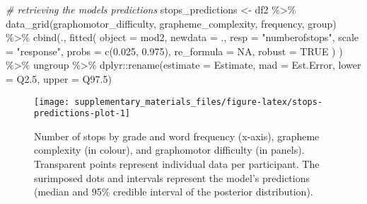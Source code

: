 \documentclass[
  11pt,
  english,
  ,doc,floatsintext]{apa6}
\newenvironment{Shaded}{}{}
\newcommand{\AttributeTok}[1]{\textcolor[rgb]{0.49,0.56,0.16}{#1}}
\newcommand{\CommentTok}[1]{\textcolor[rgb]{0.38,0.63,0.69}{\textit{#1}}}
\newcommand{\ConstantTok}[1]{\textcolor[rgb]{0.53,0.00,0.00}{#1}}
\newcommand{\FloatTok}[1]{\textcolor[rgb]{0.25,0.63,0.44}{#1}}
\newcommand{\FunctionTok}[1]{\textcolor[rgb]{0.02,0.16,0.49}{#1}}
\newcommand{\NormalTok}[1]{#1}
\newcommand{\OtherTok}[1]{\textcolor[rgb]{0.00,0.44,0.13}{#1}}
\newcommand{\SpecialCharTok}[1]{\textcolor[rgb]{0.25,0.44,0.63}{#1}}
\newcommand{\StringTok}[1]{\textcolor[rgb]{0.25,0.44,0.63}{#1}}
\begin{document}
\begin{Shaded}
\begin{Highlighting}[]
\CommentTok{\# retrieving the model\textquotesingle{}s predictions}
\NormalTok{stops\_predictions }\OtherTok{\textless{}{-}}\NormalTok{ df2 }\SpecialCharTok{\%\textgreater{}\%}
    \FunctionTok{data\_grid}\NormalTok{(graphomotor\_difficulty, grapheme\_complexity, frequency, group) }\SpecialCharTok{\%\textgreater{}\%}
    \FunctionTok{cbind}\NormalTok{(., }\FunctionTok{fitted}\NormalTok{(}
        \AttributeTok{object =}\NormalTok{ mod2, }\AttributeTok{newdata =}\NormalTok{ ., }\AttributeTok{resp =} \StringTok{"numberofstops"}\NormalTok{,}
        \AttributeTok{scale =} \StringTok{"response"}\NormalTok{, }\AttributeTok{probs =} \FunctionTok{c}\NormalTok{(}\FloatTok{0.025}\NormalTok{, }\FloatTok{0.975}\NormalTok{),}
        \AttributeTok{re\_formula =} \ConstantTok{NA}\NormalTok{, }\AttributeTok{robust =} \ConstantTok{TRUE}
\NormalTok{        ) ) }\SpecialCharTok{\%\textgreater{}\%}
\NormalTok{    ungroup }\SpecialCharTok{\%\textgreater{}\%}
\NormalTok{    dplyr}\SpecialCharTok{::}\FunctionTok{rename}\NormalTok{(}\AttributeTok{estimate =}\NormalTok{ Estimate, }\AttributeTok{mad =}\NormalTok{ Est.Error, }\AttributeTok{lower =}\NormalTok{ Q2}\FloatTok{.5}\NormalTok{, }\AttributeTok{upper =}\NormalTok{ Q97}\FloatTok{.5}\NormalTok{)}
\end{Highlighting}
\end{Shaded}

\begin{figure}[!htb]

{\centering \texttt{[image: supplementary\_materials\_files/figure-latex/stops-predictions-plot-1]} 

}

\caption{Number of stops by grade and word frequency (x-axis), grapheme complexity (in colour), and graphomotor difficulty (in panels). Transparent points represent individual data per participant. The surimposed dots and intervals represent the model's predictions (median and 95\% credible interval of the posterior distribution).}\label{fig:stops-predictions-plot}
\end{figure}
\end{document}
